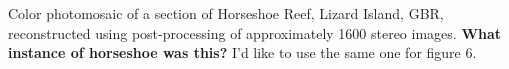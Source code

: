 \label{fig:horseshoe_mosaic}Color photomosaic of a section of Horseshoe Reef, Lizard Island, GBR, reconstructed using post-processing of approximately 1600 stereo images. \textbf{What instance of horseshoe was this? } I'd like to use the same one for figure 6.